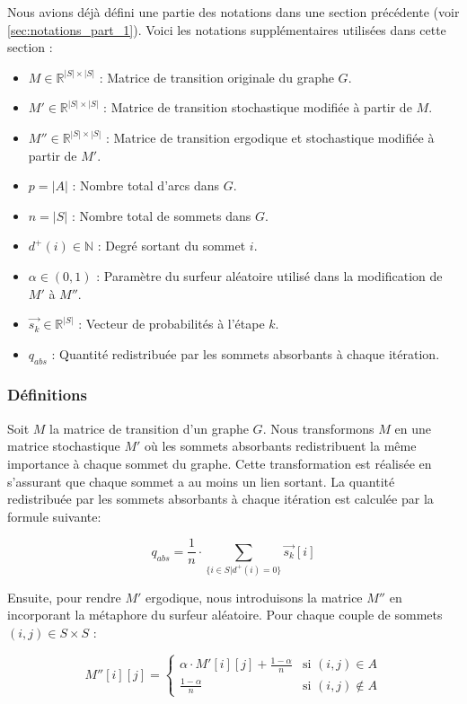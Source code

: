 Nous avions déjà défini une partie des notations dans une section précédente (voir \ref{sec:notations_part_1}). Voici les notations supplémentaires utilisées dans cette section :

\begin{itemize}
    \item $M \in \mathbb{R}^{|S| \times |S|}$ : Matrice de transition originale du graphe $G$.
    \item $M' \in \mathbb{R}^{|S| \times |S|}$ : Matrice de transition stochastique modifiée à partir de $M$.
    \item $M'' \in \mathbb{R}^{|S| \times |S|}$ : Matrice de transition ergodique et stochastique modifiée à partir de $M'$.
    \item $p = |A|$ : Nombre total d'arcs dans $G$.
    \item $n = |S|$ : Nombre total de sommets dans $G$.
    \item $d^+(i) \in \mathbb{N}$ : Degré sortant du sommet $i$.
    \item $\alpha \in (0, 1)$ : Paramètre du surfeur aléatoire utilisé dans la modification de $M'$ à $M''$.
    \item $\vec{s_k} \in \mathbb{R}^{|S|}$ : Vecteur de probabilités à l'étape $k$.
    \item $q_{abs}$ : Quantité redistribuée par les sommets absorbants à chaque itération.
\end{itemize}

\subsubsection{Définitions}

Soit $M$ la matrice de transition d'un graphe $G$. Nous transformons $M$ en une matrice stochastique $M'$ où les sommets absorbants redistribuent la même importance à chaque sommet du graphe. Cette transformation est réalisée en s'assurant que chaque sommet a au moins un lien sortant. La quantité redistribuée par les sommets absorbants à chaque itération est calculée par la formule suivante:

\[
q_{abs} = \frac{1}{n} \cdot \sum_{\{i \in S | d^+(i) = 0\}} \vec{s_k}[i]
\]

Ensuite, pour rendre $M'$ ergodique, nous introduisons la matrice $M''$ en incorporant la métaphore du surfeur aléatoire. Pour chaque couple de sommets $(i, j) \in S \times S$ :

\[
M''[i][j] = 
\begin{cases} 
\alpha \cdot M'[i][j] + \frac{1-\alpha}{n} & \text{si } (i, j) \in A \\
\frac{1-\alpha}{n} & \text{si } (i, j) \notin A 
\end{cases}
\]

